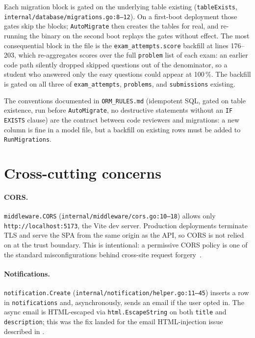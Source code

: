 Each migration block is gated on the underlying table existing (\texttt{tableExists}, \texttt{internal/database/migrations.go:8--12}). On a first-boot deployment those gates skip the blocks; \texttt{AutoMigrate} then creates the tables for real, and re-running the binary on the second boot replays the gates without effect. The most consequential block in the file is the \texttt{exam\_attempts.score} backfill at lines 176--203, which re-aggregates scores over the full \texttt{problem} list of each exam: an earlier code path silently dropped skipped questions out of the denominator, so a student who answered only the easy questions could appear at 100\,\%. The backfill is gated on all three of \texttt{exam\_attempts}, \texttt{problems}, and \texttt{submissions} existing.

The conventions documented in \texttt{ORM\_RULES.md} (idempotent SQL, gated on table existence, run before \texttt{AutoMigrate}, no destructive statements without an \texttt{IF EXISTS} clause) are the contract between code reviewers and migrations: a new column is fine in a model file, but a backfill on existing rows must be added to \texttt{RunMigrations}.

\section{Cross-cutting concerns}

\paragraph{CORS.} \texttt{middleware.CORS} (\texttt{internal/middleware/cors.go:10--18}) allows only \texttt{http://localhost:5173}, the Vite dev server. Production deployments terminate TLS and serve the SPA from the same origin as the API, so CORS is not relied on at the trust boundary. This is intentional: a permissive CORS policy is one of the standard misconfigurations behind cross-site request forgery~\cite{cwe-352}.

\paragraph{Notifications.} \texttt{notification.Create} (\texttt{internal/notification/helper.go:11--45}) inserts a row in \texttt{notifications} and, asynchronously, sends an email if the user opted in. The async email is HTML-escaped via \texttt{html.EscapeString} on both \texttt{title} and \texttt{description}; this was the fix landed for the email HTML-injection issue described in .

